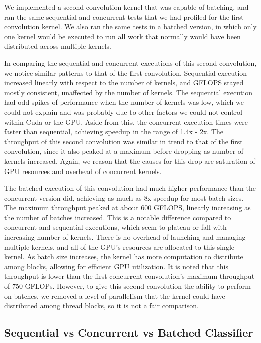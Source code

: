 \documentclass[sigconf]{acmart}
\begin{document}
We implemented a second convolution kernel that was capable of batching, and ran the same sequential and concurrent tests that we had profiled for the first convolution kernel. We also ran the same tests in a batched version, in which only one kernel would be executed to run all work that normally would have been distributed across multiple kernels.

In comparing the sequential and concurrent executions of this second convolution, we notice similar patterns to that of the first convolution. Sequential execution increased linearly with respect to the number of kernels, and GFLOPS stayed mostly consistent, unaffected by the number of kernels. The sequential execution had odd spikes of performance when the number of kernels was low, which we could not explain and was probably due to other factors we could not control within Cuda or the GPU. Aside from this, the concurrent execution times were faster than sequential, achieving speedup in the range of 1.4x - 2x. The throughput of this second convolution was similar in trend to that of the first convolution, since it also peaked at a maximum before dropping as number of kernels increased. Again, we reason that the causes for this drop are saturation of GPU resources and overhead of concurrent kernels.

The batched execution of this convolution had much higher performance than the concurrent version did, achieving as much as 8x speedup for most batch sizes. The maximum throughput peaked at about 600 GFLOPS, linearly increasing as the number of batches increased. This is a notable difference compared to concurrent and sequential executions, which seem to plateau or fall with increasing number of kernels. There is no overhead of launching and managing multiple kernels, and all of the GPU’s resources are allocated to this single kernel. As batch size increases, the kernel has more computation to distribute among blocks, allowing for efficient GPU utilization. It is noted that this throughput is lower than the first concurrent-convolution’s maximum throughput of 750 GFLOPs. However, to give this second convolution the ability to perform on batches, we removed a level of parallelism that the kernel could have distributed among thread blocks, so it is not a fair comparison.

\subsection{Sequential vs Concurrent vs Batched Classifier}
\end{document}
